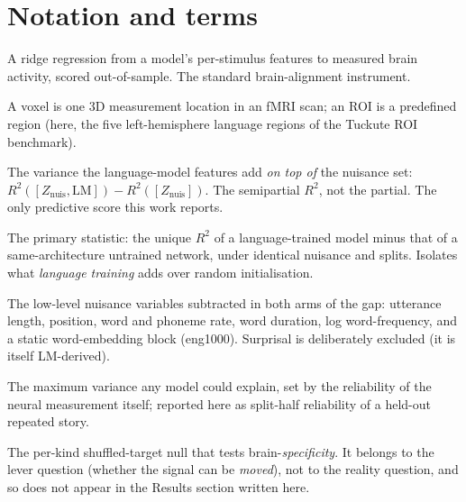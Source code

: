 %
%

\section*{Notation and terms}

\begin{description}[leftmargin=2em,style=nextline]
  \item[Encoding model] A ridge regression from a model's per-stimulus features to measured brain activity, scored out-of-sample. The standard brain-alignment instrument.
  \item[Voxel / ROI] A voxel is one 3D measurement location in an fMRI scan; an ROI is a predefined region (here, the five left-hemisphere language regions of the Tuckute ROI benchmark).
  \item[\uniqueR{} (unique $R^2$)] The variance the language-model features add \emph{on top of} the nuisance set: $R^2([Z_{\mathrm{nuis}},\mathrm{LM}]) - R^2([Z_{\mathrm{nuis}}])$. The semipartial $R^2$, not the partial. The only predictive score this work reports.
  \item[Trained$-$untrained gap] The primary statistic: the unique $R^2$ of a language-trained model minus that of a same-architecture untrained network, under identical nuisance and splits. Isolates what \emph{language training} adds over random initialisation.
  \item[$Z_{\mathrm{nuis}}$ (nuisance set)] The low-level nuisance variables subtracted in both arms of the gap: utterance length, position, word and phoneme rate, word duration, log word-frequency, and a static word-embedding block (eng1000). Surprisal is deliberately excluded (it is itself LM-derived).
  \item[Noise ceiling] The maximum variance any model could explain, set by the reliability of the neural measurement itself; reported here as split-half reliability of a held-out repeated story.
  \item[Permuted twin] The per-kind shuffled-target null that tests brain-\emph{specificity}. It belongs to the lever question (whether the signal can be \emph{moved}), not to the reality question, and so does not appear in the Results section written here.

\end{description}
